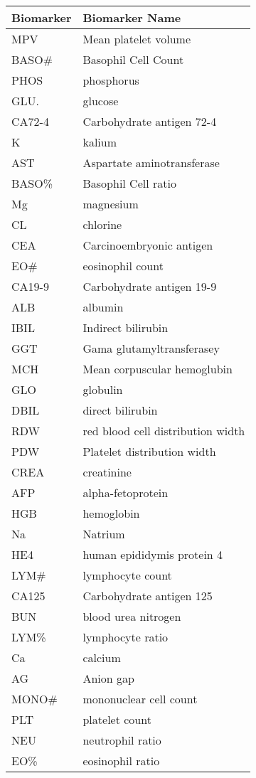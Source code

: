 \documentclass[11pt]{article}
\begin{document}
\begin{longtable}[]{@{}ll@{}}
\toprule\noalign{}
Biomarker & Biomarker Name \\
\midrule\noalign{}
\endhead
\bottomrule\noalign{}
\endlastfoot
MPV & Mean platelet volume \\
BASO\# & Basophil Cell Count \\
PHOS & phosphorus \\
GLU. & glucose \\
CA72-4 & Carbohydrate antigen 72-4 \\
K & kalium \\
AST & Aspartate aminotransferase \\
BASO\% & Basophil Cell ratio \\
Mg & magnesium \\
CL & chlorine \\
CEA & Carcinoembryonic antigen \\
EO\# & eosinophil count \\
CA19-9 & Carbohydrate antigen 19-9 \\
ALB & albumin \\
IBIL & Indirect bilirubin \\
GGT & Gama glutamyltransferasey \\
MCH & Mean corpuscular hemoglubin \\
GLO & globulin \\
DBIL & direct bilirubin \\
RDW & red blood cell distribution width \\
PDW & Platelet distribution width \\
CREA & creatinine \\
AFP & alpha-fetoprotein \\
HGB & hemoglobin \\
Na & Natrium \\
HE4 & human epididymis protein 4 \\
LYM\# & lymphocyte count \\
CA125 & Carbohydrate antigen 125 \\
BUN & blood urea nitrogen \\
LYM\% & lymphocyte ratio \\
Ca & calcium \\
AG & Anion gap \\
MONO\# & mononuclear cell count \\
PLT & platelet count \\
NEU & neutrophil ratio \\
EO\% & eosinophil ratio \\

\end{longtable}
\end{document}
